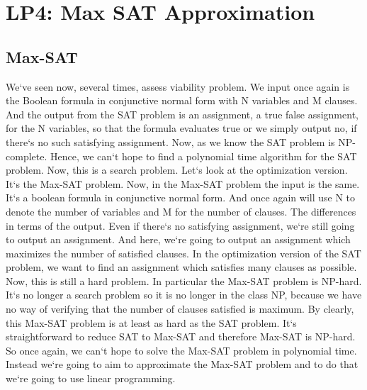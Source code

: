 \section{LP4: Max SAT Approximation}

\subsection{Max-SAT}
We`ve seen now, several times, assess viability problem.
We input once again is the Boolean formula in conjunctive normal form with N variables and M clauses.
And the output from the SAT problem is an assignment, a true false assignment, for the N variables, so that the formula evaluates true or we simply output no, if there`s no such satisfying assignment.
Now, as we know the SAT problem is NP-complete.
Hence, we can`t hope to find a polynomial time algorithm for the SAT problem.
Now, this is a search problem.
Let`s look at the optimization version.
It`s the Max-SAT problem.
Now, in the Max-SAT problem the input is the same.
It`s a boolean formula in conjunctive normal form.
And once again will use N to denote the number of variables and M for the number of clauses.
The differences in terms of the output.
Even if there`s no satisfying assignment, we`re still going to output an assignment.
And here, we`re going to output an assignment which maximizes the number of satisfied clauses.
In the optimization version of the SAT problem, we want to find an assignment which satisfies many clauses as possible.
Now, this is still a hard problem.
In particular the Max-SAT problem is NP-hard.
It`s no longer a search problem so it is no longer in the class NP, because we have no way of verifying that the number of clauses satisfied is maximum.
By clearly, this Max-SAT problem is at least as hard as the SAT problem.
It`s straightforward to reduce SAT to Max-SAT and therefore Max-SAT is NP-hard.
So once again, we can`t hope to solve the Max-SAT problem in polynomial time.
Instead we`re going to aim to approximate the Max-SAT problem and to do that we`re going to use linear programming.

